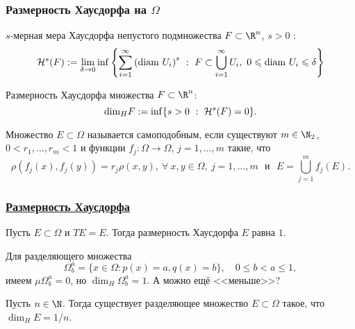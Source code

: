 \begin{frame}\frametitle{Размерность Хаусдорфа на $\Omega$}


	$s$-мерная мера Хаусдорфа непустого подмножества $F\subset \R^n$, $s > 0$ :
	$$\mathcal H^s(F) := \lim_{\delta\to0} \inf \left\{\sum_{i=1}^\infty \left({\rm diam} \ U_i \right)^s \ : \ F\subset \bigcup_{i=1}^\infty  U_i, \  0\leqslant {\rm diam} \ U_i \leqslant \delta \right\}$$

	\vfill

	Размерность Хаусдорфа множества  $F\subset \R^n$:
	$${\rm dim}_H F := \inf\{ s > 0 \ : \ \mathcal H^s(F)=0\}.$$

	\vfill

	\begin{ddefinition}
		Множество $E\subset\Omega$ называется самоподобным, если существуют $m\in\N_2$,
		$0< r_1, \dots, r_m<1$ и функции $f_j : \Omega \to \Omega$, $j=1,\dots, m$ такие, что
		$$
			\rho(f_j(x), f_j(y)) = r_j \rho(x,y), \ \forall \ x,y \in \Omega, \ j=1,\dots, m
			\mbox{~~и~~} E=\bigcup_{j=1}^m f_j(E).
		$$

	\end{ddefinition}
\end{frame}







\begin{frame}\frametitle{\underline{Размерность Хаусдорфа}}

	\begin{llemma}
		\label{lem:Hausdorf_measure}
		Пусть $E\subset\Omega$ и $TE = E$.
		Тогда размерность Хаусдорфа $E$ равна $1$.
	\end{llemma}

	\vfill

	Для разделяющего множества
	\begin{equation}
		\Omega^a_b = \{x\in\Omega : p(x) = a, q(x) = b\}
		,
		\quad 0 \leq b < a \leq 1
		,
	\end{equation}
	имеем $\mu\Omega^a_b = 0$, но  $\dim_H \Omega^a_b = 1$. А можно ещё <<меньше>>?

	\vfill


	\begin{ttheorem}
		Пусть $n\in\N$.
		Тогда существует разделяющее множество $E\subset\Omega$ такое,
		что $\dim_H E = 1/n$.
	\end{ttheorem}
\end{frame}
